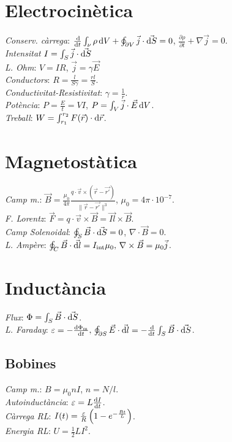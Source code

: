 \section{Electrocinètica}
\emph{Conserv. càrrega}: $\frac{\dif}{\dif t} \int_\nu \rho \dif V + 
                          \oint_{\partial V} \vec{j} \cdot \vec{\dif S} = 0$,
                          $\frac{\partial\rho}{\partial t} + \nabla \vec{j} = 0 $.\\
\emph{Intensitat} $I = \int_S \vec{j} \cdot \vec{\dif S}$\\
\emph{L. Ohm}: $V=IR$, $\vec{j} = \gamma \vec{E}$\\
\emph{Conductors}: $R = \frac{l}{S\gamma} = \frac{rl}{S}$. \\
\emph{Conductivitat-Resistivitat}: $\gamma = \frac{1}{r}$. \\
\emph{Potència}: $P=\frac{E}{t}=VI$, $P = \int_{V} \vec{j} \cdot \vec{E} \dif V$. \\
\emph{Treball}: $W=\int_{r_1}^{r_2} F(\vec{r}) \cdot \dif \vec{r}$.

\section{Magnetostàtica}
\emph{Camp m.}: $\vec{B} = \frac{\mu_0}{4\pi}\frac{q\cdot \vec{v}\times (\vec{r} - \vec{r'})}{\|\vec{r} -\vec{r'}\|^3}$, $\mu_0=4\pi \cdot 10^{-7}$. \\
\emph{F. Lorentz}: $\vec{F} = q \cdot\vec{v}\times\vec{B} = \vec{Il} \times \vec{B}$. \\

\emph{Camp Solenoidal}: $\oint_S \vec{B} \cdot \vec{\dif S} = 0$, $\nabla \cdot \vec{B} = 0$.\\
\emph{L. Ampère}: $\oint_C \vec{B}\cdot \vec{\dif l} = I_{\text{int}} \mu_0, \, \nabla \times \vec{B} = \mu_0 \vec{j}$.

\section{Inductància}
\emph{Flux}: $\Phi = \int_S \vec{B}\cdot \vec{\dif S}$. \\
\emph{L. Faraday}: $\varepsilon = -\frac{\dif \Phi_{\text{m}}}{\dif t}, \, \oint_{\partial S} \vec{E} \cdot \vec{\dif l} = -\frac{\dif}{\dif t}\int_S \vec{B} \cdot \vec{\dif S}$.
\subsection{Bobines}
\emph{Camp m.}: $B = \mu_0 n I$, $n = N/l$.\\
\emph{Autoinductància}: $\varepsilon = L \frac{\dif I}{\dif t}$.\\
\emph{Càrrega RL}: $I(t) = \frac{\varepsilon}{R} \left( 1 - e^{-\frac{Rt}{L}}\right)$.\\
\emph{Energia RL}: $U = \frac{1}{2}LI^2$.


